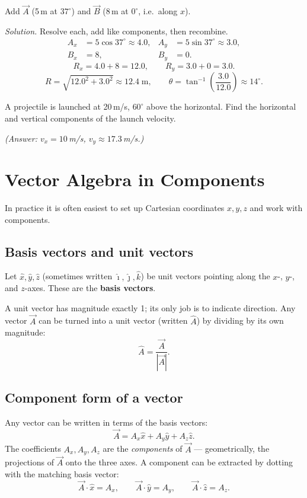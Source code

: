 \begin{workedexample}
Add $\vec{A}$ (5\,m at $37^\circ$) and $\vec{B}$ (8\,m at $0^\circ$, i.e.\ along $x$).

\medskip
\textit{Solution.} Resolve each, add like components, then recombine.
\begin{align*}
  A_x &= 5\cos37^\circ \approx 4.0, & A_y &= 5\sin37^\circ \approx 3.0,\\
  B_x &= 8,                          & B_y &= 0.
\end{align*}
\[
  R_x = 4.0+8 = 12.0, \qquad R_y = 3.0+0 = 3.0.
\]
\[
  R = \sqrt{12.0^2+3.0^2} \approx 12.4\;\text{m}, \qquad
  \theta = \tan^{-1}\!\!\left(\frac{3.0}{12.0}\right) \approx 14^\circ.
\]
\end{workedexample}

\begin{tryit}
A projectile is launched at 20\,m/s, $60^\circ$ above the horizontal. Find the horizontal and
vertical components of the launch velocity.

\textit{(Answer: $v_x=10$\,m/s, $v_y\approx17.3$\,m/s.)}
\end{tryit}


\section{Vector Algebra in Components}

In practice it is often easiest to set up Cartesian coordinates $x,y,z$ and work with
components.

\subsection{Basis vectors and unit vectors}
Let $\hat{x},\hat{y},\hat{z}$ (sometimes written $\hat{\imath},\hat{\jmath},\hat{k}$) be unit vectors
pointing along the $x$-, $y$-, and $z$-axes. These are the \textbf{basis vectors}.

\begin{keybox}
A unit vector has magnitude exactly 1; its only job is to indicate direction. Any vector
$\vec{A}$ can be turned into a unit vector (written $\hat{A}$) by dividing by its own magnitude:
\[
  \hat{A} = \frac{\vec{A}}{|\vec{A}|}.
\]
\end{keybox}

\subsection{Component form of a vector}
Any vector can be written in terms of the basis vectors:
\[
  \vec{A} = A_x\hat{x} + A_y\hat{y} + A_z\hat{z}.
\]
The coefficients $A_x,A_y,A_z$ are the \emph{components} of $\vec{A}$ --- geometrically, the
projections of $\vec{A}$ onto the three axes. A component can be extracted by dotting with
the matching basis vector:
\[
  \vec{A}\cdot\hat{x} = A_x, \qquad \vec{A}\cdot\hat{y} = A_y, \qquad \vec{A}\cdot\hat{z} = A_z.
\]


